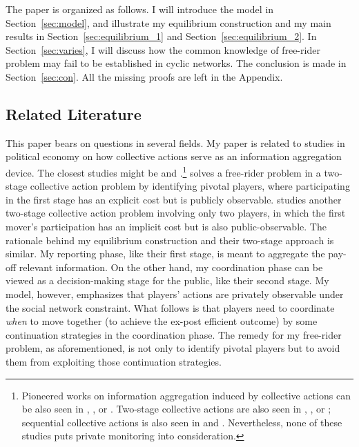 \documentclass[12pt,letter]{article}
\theoremstyle{definition}
\theoremstyle{definition}
\theoremstyle{remark}
\theoremstyle{claim}
\begin{document}
The paper is organized as follows. I will introduce the model in Section~\ref{sec:model}, and illustrate my equilibrium construction and my main results in Section~\ref{sec:equilibrium_1} and Section~\ref{sec:equilibrium_2}. In Section~\ref{sec:varies}, I will discuss how the common knowledge of free-rider problem may fail to be established in cyclic networks. The conclusion is made in Section~\ref{sec:con}. All the missing proofs are left in the Appendix.



\subsection{Related Literature}

This paper bears on questions in several fields. My paper is related to studies in political economy on how collective actions serve as an information aggregation device. The closest studies might be \citep{Lohmann1994} and \citep{SHADMEHR2019}.\footnote{Pioneered works on information aggregation induced by collective actions can be also seen in \citep{Austin-smith1996}, \citep{OLSON1965}, or \citep{Feddersen1997}. Two-stage collective actions are also seen in \citep{Lohmann1993}, \citep{SHADMEHR2015}, or \citep{Battaglini2016}; sequential collective actions is also seen in \citep{Dekel2000} and \citep{Piketty2000}. Nevertheless, none of these studies puts private monitoring into consideration.} 
\citep{Lohmann1994} solves a free-rider problem in a two-stage collective action problem by identifying pivotal players, where participating in the first stage has an explicit cost but is publicly observable. \citep{SHADMEHR2019} studies another two-stage collective action problem involving only two players, in which the first mover's participation has an implicit cost but is also public-observable. The rationale behind my equilibrium construction and their two-stage approach is similar. My reporting phase, like their first stage, is meant to aggregate the pay-off relevant information. On the other hand, my coordination phase can be viewed as a decision-making stage for the public, like their second stage. My model, however, emphasizes that players' actions are privately observable under the social network constraint. What follows is that players need to coordinate \textit{when} to move together (to achieve the ex-post efficient outcome) by some continuation strategies in the coordination phase. The remedy for my free-rider problem, as aforementioned, is not only to identify pivotal players but to avoid them from exploiting those continuation strategies.      
\end{document}
